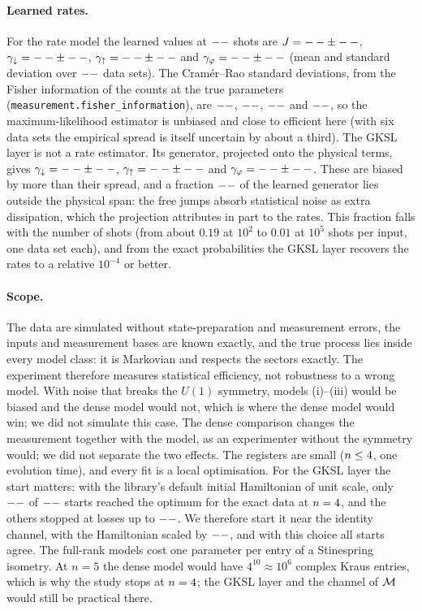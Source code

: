 \paragraph{Learned rates.} For the rate model the learned values at $--$ shots are $J=--\pm
--$, $\gamma_\downarrow=--\pm--$, $\gamma_\uparrow=--\pm--$ and
$\gamma_\varphi=--\pm--$ (mean and standard deviation over $--$ data sets). The
Cram\'er--Rao standard deviations, from the Fisher information of the counts at the true parameters
(\texttt{measurement.fisher\_information}), are $--$, $--$, $--$
and $--$, so the maximum-likelihood estimator is unbiased and close to efficient here (with six data sets the
empirical spread is itself uncertain by about a third). The GKSL layer is not a rate estimator. Its generator,
projected onto the physical terms, gives $\gamma_\downarrow=--\pm--$,
$\gamma_\uparrow=--\pm--$ and $\gamma_\varphi=--\pm--$. These are
biased by more than their spread, and a fraction $--$ of the learned generator lies outside the physical span:
the free jumps absorb statistical noise as extra dissipation, which the projection attributes in part to the rates.
This fraction falls with the number of shots (from about $0.19$ at $10^2$ to $0.01$ at $10^5$ shots per input, one data set
each), and from the exact probabilities the GKSL layer recovers the rates to a relative $10^{-4}$ or better.

\paragraph{Scope.} The data are simulated without state-preparation and measurement errors, the inputs and
measurement bases are known exactly, and the true process lies inside every model class: it is Markovian and
respects the sectors exactly. The experiment therefore measures statistical efficiency, not robustness to a wrong
model. With noise that breaks the $U(1)$ symmetry, models (i)--(iii) would be biased and the dense model would not,
which is where the dense model would win; we did not simulate this case. The dense comparison changes the measurement
together with the model, as an experimenter without the symmetry would; we did not separate the two effects. The
registers are small ($n\le4$, one evolution time), and every fit is a local optimisation. For the GKSL layer the
start matters: with the library's default initial Hamiltonian of unit scale, only $--$ of
$--$ starts reached the optimum for the exact data at $n=4$, and the others stopped at losses up to
$--$. We therefore start it near the identity channel, with the Hamiltonian scaled by $--$, and with
this choice all starts agree. The full-rank models cost one parameter per entry of a Stinespring isometry. At
$n=5$ the dense model would have $4^{10}\approx10^6$ complex Kraus entries, which is why the study stops at
$n=4$; the GKSL layer and the channel of $\mathcal{M}$ would still be practical there.
